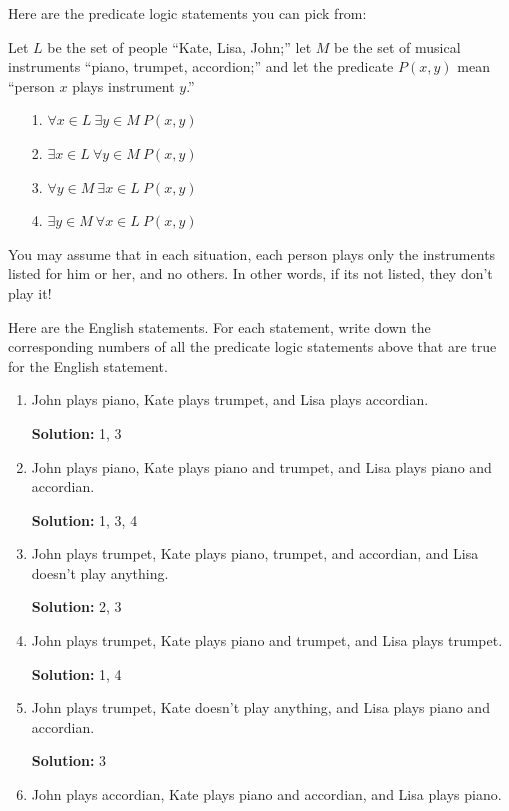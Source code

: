 \documentclass[12pt, letterpaper]{report}
\begin{document}
\begin{enumerate}
Here are the predicate logic statements you can pick from:

Let $L$ be the set of people ``Kate, Lisa, John;'' let $M$ be the set of musical instruments ``piano, trumpet, accordion;'' and 
let the predicate $P(x,y)$ mean ``person $x$ plays instrument $y$.''

\begin{enumerate}
        \item[1.]  $\forall x \in L \ \exists y \in M \ P(x, y)$
        \item[2.]  $\exists x \in L \ \forall y \in M \ P(x, y)$
        \item[3.]  $\forall y \in M \ \exists x \in L \ P(x, y)$
        \item[4.]  $\exists y \in M \ \forall x \in L \ P(x, y)$
\end{enumerate}

You may assume that in each situation, each person plays only the instruments listed for him or her, and no others. In other words, if its not listed, they don't play it!

Here are the English statements.  For each statement, write down the corresponding numbers of all the predicate logic statements above that are true for the
English statement.

\begin{enumerate}
\item John plays piano, Kate plays trumpet, and Lisa plays accordian.

\textbf{Solution:} 1, 3

\item John plays piano, Kate plays piano and trumpet, and Lisa plays piano and accordian.

\textbf{Solution:} 1, 3, 4

\item John plays trumpet, Kate plays piano, trumpet, and accordian, and Lisa doesn't play anything.

\textbf{Solution:} 2, 3

\item John plays trumpet, Kate plays piano and trumpet, and Lisa plays trumpet.

\textbf{Solution:} 1, 4

\item John plays trumpet, Kate doesn't play anything, and Lisa plays piano and accordian.

\textbf{Solution:} 3

\item John plays accordian, Kate plays piano and accordian, and Lisa plays piano.


\end{enumerate}
\end{enumerate}
\end{document}
